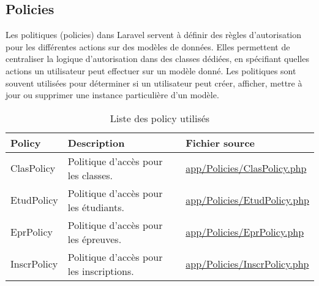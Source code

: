 \subsection{Policies}

Les politiques (policies) dans Laravel servent à définir des règles d'autorisation pour les différentes actions sur des modèles de données. Elles permettent de centraliser la logique d'autorisation dans des classes dédiées, en spécifiant quelles actions un utilisateur peut effectuer sur un modèle donné. Les politiques sont souvent utilisées pour déterminer si un utilisateur peut créer, afficher, mettre à jour ou supprimer une instance particulière d'un modèle.

\begin{table}[H]
	\begin{adjustbox}{width=\textwidth}
		\begin{tabular}{|l|p{}|p{}|}
			\hline
			\textbf{Policy} & \textbf{Description} & \textbf{Fichier source} \\
			\hline
			ClasPolicy & Politique d'accès pour les classes. & \url{app/Policies/ClasPolicy.php} \\
			EtudPolicy 		& Politique d'accès pour les étudiants. 		& \url{app/Policies/EtudPolicy.php} \\
			EprPolicy 		& Politique d'accès pour les épreuves. 		& \url{app/Policies/EprPolicy.php} \\
			InscrPolicy 	& Politique d'accès pour les inscriptions. 	& \url{app/Policies/InscrPolicy.php} \\
			\hline
		\end{tabular}
	\end{adjustbox}
	\caption{Liste des policy utilisés}
\end{table}